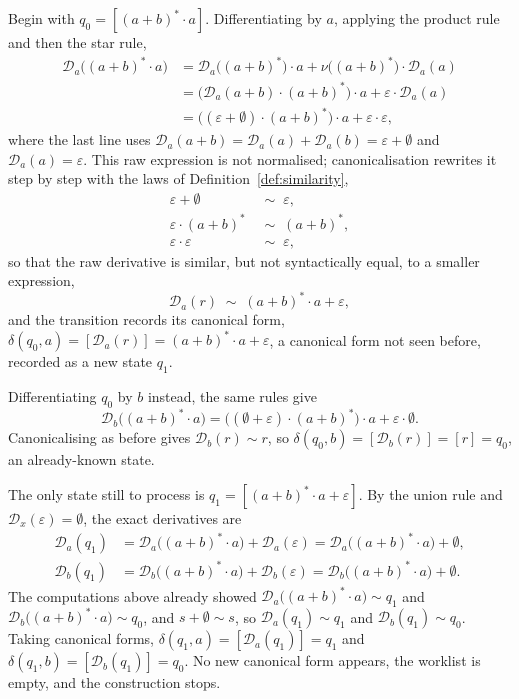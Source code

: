 Begin with $q_0=[(a+b)^{*}\cdot a]$. Differentiating by $a$, applying the product
rule and then the star rule,
\[
\begin{aligned}
\mathcal{D}_a\bigl((a+b)^{*}\cdot a\bigr)
  &= \mathcal{D}_a\bigl((a+b)^{*}\bigr)\cdot a
     + \nu\bigl((a+b)^{*}\bigr)\cdot \mathcal{D}_a(a)\\
  &= \bigl(\mathcal{D}_a(a+b)\cdot (a+b)^{*}\bigr)\cdot a
     + \varepsilon\cdot \mathcal{D}_a(a)\\
  &= \bigl((\varepsilon+\emptyset)\cdot (a+b)^{*}\bigr)\cdot a
     + \varepsilon\cdot\varepsilon,
\end{aligned}
\]
where the last line uses
$\mathcal{D}_a(a+b)=\mathcal{D}_a(a)+\mathcal{D}_a(b)=\varepsilon+\emptyset$ and
$\mathcal{D}_a(a)=\varepsilon$. This raw expression is not normalised;
canonicalisation rewrites it step by step with the laws of
Definition~\ref{def:similarity},
\[
\begin{aligned}
  \varepsilon+\emptyset &\;\sim\; \varepsilon,\\
  \varepsilon\cdot (a+b)^{*} &\;\sim\; (a+b)^{*},\\
  \varepsilon\cdot\varepsilon &\;\sim\; \varepsilon,
\end{aligned}
\]
so that the raw derivative is similar, but not syntactically equal, to a smaller
expression,
\[
  \mathcal{D}_a(r)\;\sim\;(a+b)^{*}\cdot a + \varepsilon,
\]
and the transition records its canonical form,
$\delta(q_0,a)=[\mathcal{D}_a(r)]=(a+b)^{*}\cdot a + \varepsilon$, a canonical form
not seen before, recorded as a new state $q_1$.

Differentiating $q_0$ by $b$ instead, the same rules give
\[
\mathcal{D}_b\bigl((a+b)^{*}\cdot a\bigr)
  = \bigl((\emptyset+\varepsilon)\cdot (a+b)^{*}\bigr)\cdot a
     + \varepsilon\cdot\emptyset.
\]
Canonicalising as before gives $\mathcal{D}_b(r)\sim r$, so
$\delta(q_0,b)=[\mathcal{D}_b(r)]=[r]=q_0$, an already-known state.

The only state still to process is $q_1=[(a+b)^{*}\cdot a + \varepsilon]$. By the union
rule and $\mathcal{D}_x(\varepsilon)=\emptyset$, the exact derivatives are
\[
\begin{aligned}
\mathcal{D}_a(q_1)
  &= \mathcal{D}_a\bigl((a+b)^{*}\cdot a\bigr) + \mathcal{D}_a(\varepsilon)
   = \mathcal{D}_a\bigl((a+b)^{*}\cdot a\bigr) + \emptyset,\\[0.4ex]
\mathcal{D}_b(q_1)
  &= \mathcal{D}_b\bigl((a+b)^{*}\cdot a\bigr) + \mathcal{D}_b(\varepsilon)
   = \mathcal{D}_b\bigl((a+b)^{*}\cdot a\bigr) + \emptyset.
\end{aligned}
\]
The computations above already showed
$\mathcal{D}_a\bigl((a+b)^{*}\cdot a\bigr)\sim q_1$ and
$\mathcal{D}_b\bigl((a+b)^{*}\cdot a\bigr)\sim q_0$, and $s+\emptyset\sim s$, so
$\mathcal{D}_a(q_1)\sim q_1$ and $\mathcal{D}_b(q_1)\sim q_0$. Taking canonical forms,
$\delta(q_1,a)=[\mathcal{D}_a(q_1)]=q_1$ and
$\delta(q_1,b)=[\mathcal{D}_b(q_1)]=q_0$. No new canonical form appears, the
worklist is empty, and the construction stops.

